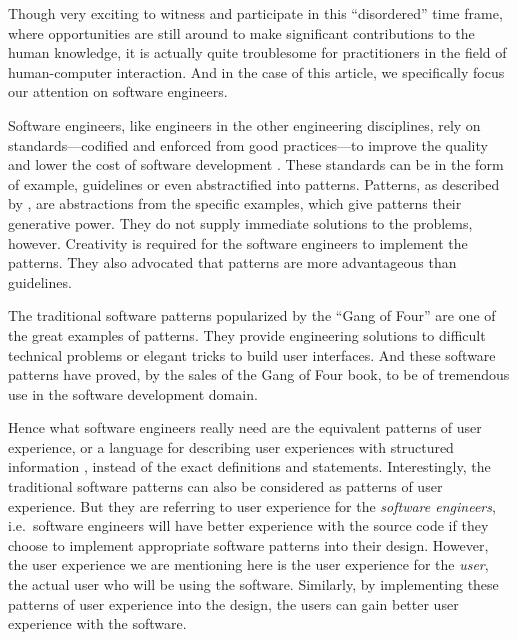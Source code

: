 \documentclass{acm_proc_article-sp}
\begin{document}
Though very exciting to witness and participate in this ``disordered''
time frame, where opportunities are still around to make significant
contributions to the human knowledge, it is actually quite troublesome
for practitioners in the field of human-computer interaction. And in
the case of this article, we specifically focus our attention on
software engineers.

Software engineers, like engineers in the other engineering
disciplines, rely on standards---codified and enforced from good
practices---to improve the quality and lower the cost of software
development \citep{practice:ipenz}. These standards can be in the form
of example, guidelines or even abstractified into patterns. Patterns,
as described by \citet{patterns:griffiths}, are abstractions from the
specific examples, which give patterns their generative power. They do
not supply immediate solutions to the problems, however. Creativity is
required for the software engineers to implement the patterns. They
also advocated that patterns are more advantageous than guidelines.

The traditional software patterns popularized by the ``Gang of Four''
\citep{patterns:gamma} are one of the great examples of patterns. They
provide engineering solutions to difficult technical problems or
elegant tricks to build user interfaces. And these software patterns
have proved, by the sales of the Gang of Four book, to be of
tremendous use in the software development domain.

Hence what software engineers really need are the equivalent patterns
of user experience, or a language for describing user experiences with
structured information \citep{pux:blackwell}, instead of the exact
definitions and statements. Interestingly, the traditional software
patterns can also be considered as patterns of user experience. But
they are referring to user experience for the \textit{software
  engineers}, i.e.\ software engineers will have better experience
with the source code if they choose to implement appropriate software
patterns into their design. However, the user experience we are
mentioning here is the user experience for the \textit{user}, the
actual user who will be using the software. Similarly, by implementing
these patterns of user experience into the design, the users can gain
better user experience with the software.

\end{document}
